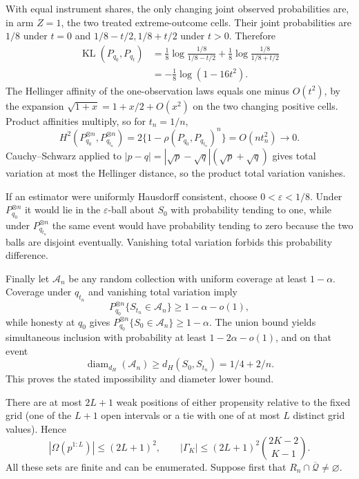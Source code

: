 With equal instrument shares, the only changing joint observed probabilities are, in arm \(Z=1\), the two treated extreme-outcome cells.  Their joint probabilities are \(1/8\) under \(t=0\) and \(1/8-t/2,1/8+t/2\) under \(t>0\).  Therefore
\[
\begin{aligned}
\operatorname{KL}(P_{q_0},P_{q_t})
&=\frac18\log\frac{1/8}{1/8-t/2}
 +\frac18\log\frac{1/8}{1/8+t/2}\\
&=-\frac18\log(1-16t^2).
\end{aligned}
\]
The Hellinger affinity of the one-observation laws equals one minus \(O(t^2)\), by the expansion \(\sqrt{1+x}=1+x/2+O(x^2)\) on the two changing positive cells.  Product affinities multiply, so for \(t_n=1/n\),
\[
H^2(P_{q_0}^{\otimes n},P_{q_{t_n}}^{\otimes n})
=2\{1-\rho(P_{q_0},P_{q_{t_n}})^n\}=O(nt_n^2)\to0.
\]
Cauchy--Schwarz applied to \(|p-q|=|\sqrt p-\sqrt q|(\sqrt p+\sqrt q)\) gives total variation at most the Hellinger distance, so the product total variation vanishes.

If an estimator were uniformly Hausdorff consistent, choose \(0<\varepsilon<1/8\).  Under \(P_{q_0}^{\otimes n}\) it would lie in the \(\varepsilon\)-ball about \(S_0\) with probability tending to one, while under \(P_{q_{t_n}}^{\otimes n}\) the same event would have probability tending to zero because the two balls are disjoint eventually.  Vanishing total variation forbids this probability difference.

Finally let \(\mathcal A_n\) be any random collection with uniform coverage at least \(1-\alpha\).  Coverage under \(q_{t_n}\) and vanishing total variation imply
\[
P_{q_0}^{\otimes n}\{S_{t_n}\in\mathcal A_n\}\ge1-\alpha-o(1),
\]
while honesty at \(q_0\) gives \(P_{q_0}^{\otimes n}\{S_0\in\mathcal A_n\}\ge1-\alpha\).  The union bound yields simultaneous inclusion with probability at least \(1-2\alpha-o(1)\), and on that event
\[
\operatorname{diam}_{d_H}(\mathcal A_n)\ge d_H(S_0,S_{t_n})=1/4+2/n.
\]
This proves the stated impossibility and diameter lower bound.

There are at most \(2L+1\) weak positions of either propensity relative to the fixed grid (one of the \(L+1\) open intervals or a tie with one of at most \(L\) distinct grid values).  Hence
\[
|\Omega(p^{1:L})|\le(2L+1)^2,\qquad
|\Gamma_K|\le(2L+1)^2\binom{2K-2}{K-1}.
\tag{1}
\]
All these sets are finite and can be enumerated.  Suppose first that \(R_n\cap\overline{\mathcal Q}\ne\varnothing\).

